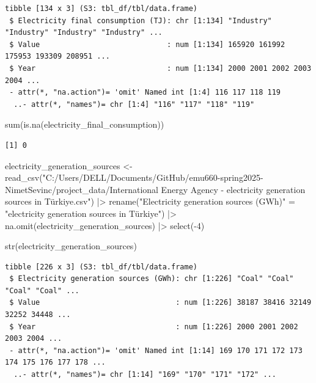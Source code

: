 \documentclass[
  letterpaper,
  DIV=11,
  numbers=noendperiod]{scrartcl}
\newenvironment{Shaded}{\begin{snugshade}}{\end{snugshade}}
\newcommand{\DecValTok}[1]{\textcolor[rgb]{0.68,0.00,0.00}{#1}}
\newcommand{\FunctionTok}[1]{\textcolor[rgb]{0.28,0.35,0.67}{#1}}
\newcommand{\NormalTok}[1]{\textcolor[rgb]{0.00,0.23,0.31}{#1}}
\newcommand{\OtherTok}[1]{\textcolor[rgb]{0.00,0.23,0.31}{#1}}
\newcommand{\SpecialCharTok}[1]{\textcolor[rgb]{0.37,0.37,0.37}{#1}}
\newcommand{\StringTok}[1]{\textcolor[rgb]{0.13,0.47,0.30}{#1}}
\begin{document}
\begin{verbatim}
tibble [134 x 3] (S3: tbl_df/tbl/data.frame)
 $ Electricity final consumption (TJ): chr [1:134] "Industry" "Industry" "Industry" "Industry" ...
 $ Value                             : num [1:134] 165920 161992 175953 193309 208951 ...
 $ Year                              : num [1:134] 2000 2001 2002 2003 2004 ...
 - attr(*, "na.action")= 'omit' Named int [1:4] 116 117 118 119
  ..- attr(*, "names")= chr [1:4] "116" "117" "118" "119"
\end{verbatim}

\begin{Shaded}
\begin{Highlighting}[]
\FunctionTok{sum}\NormalTok{(}\FunctionTok{is.na}\NormalTok{(electricity\_final\_consumption))}
\end{Highlighting}
\end{Shaded}

\begin{verbatim}
[1] 0
\end{verbatim}

\begin{Shaded}
\begin{Highlighting}[]
\NormalTok{electricity\_generation\_sources }\OtherTok{\textless{}{-}} \FunctionTok{read\_csv}\NormalTok{(}\StringTok{"C:/Users/DELL/Documents/GitHub/emu660{-}spring2025{-}NimetSevinc/project\_data/International Energy Agency {-} electricity generation sources in Türkiye.csv"}\NormalTok{) }\SpecialCharTok{|\textgreater{}} \FunctionTok{rename}\NormalTok{(}\StringTok{"Electricity generation sources (GWh)"} \OtherTok{=} \StringTok{"electricity generation sources in Türkiye"}\NormalTok{) }\SpecialCharTok{|\textgreater{}} \FunctionTok{na.omit}\NormalTok{(electricity\_generation\_sources) }\SpecialCharTok{|\textgreater{}} \FunctionTok{select}\NormalTok{(}\SpecialCharTok{{-}}\DecValTok{4}\NormalTok{)}

\FunctionTok{str}\NormalTok{(electricity\_generation\_sources)}
\end{Highlighting}
\end{Shaded}

\begin{verbatim}
tibble [226 x 3] (S3: tbl_df/tbl/data.frame)
 $ Electricity generation sources (GWh): chr [1:226] "Coal" "Coal" "Coal" "Coal" ...
 $ Value                               : num [1:226] 38187 38416 32149 32252 34448 ...
 $ Year                                : num [1:226] 2000 2001 2002 2003 2004 ...
 - attr(*, "na.action")= 'omit' Named int [1:14] 169 170 171 172 173 174 175 176 177 178 ...
  ..- attr(*, "names")= chr [1:14] "169" "170" "171" "172" ...
\end{verbatim}
\end{document}
